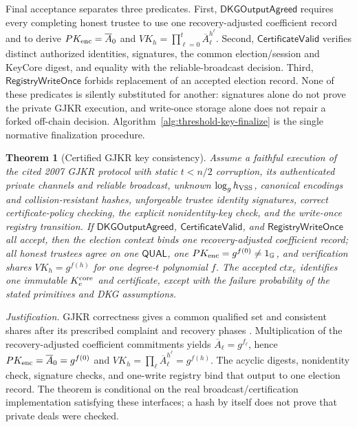 \documentclass[pdflatex,sn-mathphys-num]{sn-jnl}%
\theoremstyle{thmstyleone}%
\newtheorem{theorem}{Theorem}%
\theoremstyle{thmstyletwo}%
\theoremstyle{thmstylethree}%
\begin{document}
Final acceptance separates three predicates.  First,
$\mathsf{DKGOutputAgreed}$ requires every completing honest trustee to use one
recovery-adjusted coefficient record and to derive
$PK_{\rm enc}=\overline A_0$ and
$VK_h=\prod_{\ell=0}^t\overline A_\ell^{h^\ell}$.  Second,
$\mathsf{CertificateValid}$ verifies distinct authorized identities,
signatures, the common election/session and KeyCore digest, and equality with
the reliable-broadcast decision.  Third, $\mathsf{RegistryWriteOnce}$ forbids
replacement of an accepted election record.  None of these predicates is
silently substituted for another: signatures alone do not prove the private
GJKR execution, and write-once storage alone does not repair a forked off-chain
decision.  Algorithm~\ref{alg:threshold-key-finalize} is the single normative
finalization procedure.

\begin{theorem}[Certified GJKR key consistency]
\label{thm:threshold-key-consistency}
Assume a faithful execution of the cited 2007 GJKR protocol with static
$t<n/2$ corruption, its authenticated private channels and reliable broadcast,
unknown $\log_g h_{\rm VSS}$, canonical encodings and collision-resistant
hashes, unforgeable trustee identity signatures, correct certificate-policy
checking, the explicit nonidentity-key check, and the write-once registry
transition.  If $\mathsf{DKGOutputAgreed}$,
$\mathsf{CertificateValid}$, and $\mathsf{RegistryWriteOnce}$ all accept, then
the election context binds one recovery-adjusted coefficient record; all
honest trustees agree on one $\mathsf{QUAL}$, one
$PK_{\rm enc}=g^{f(0)}\neq1_{\mathbb G}$, and verification shares
$VK_h=g^{f(h)}$ for one degree-$t$ polynomial $f$.  The accepted $ctx_e$
identifies one immutable $K_e^{\rm core}$ and certificate, except with the
failure probability of the stated primitives and DKG assumptions.
\end{theorem}

\textit{Justification.} GJKR correctness gives a common qualified set and
consistent shares after its prescribed complaint and recovery phases
\cite{bib133}.  Multiplication of the recovery-adjusted coefficient
commitments yields $\overline A_\ell=g^{f_\ell}$, hence
$PK_{\rm enc}=\overline A_0=g^{f(0)}$ and
$VK_h=\prod_\ell\overline A_\ell^{h^\ell}=g^{f(h)}$.  The acyclic digests,
nonidentity check, signature checks, and one-write registry bind that output to one election
record.  The theorem is conditional on the real broadcast/certification
implementation satisfying these interfaces; a hash by itself does not prove
that private deals were checked.
\end{document}
